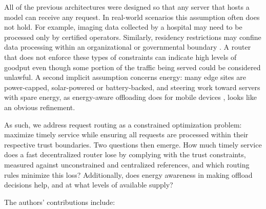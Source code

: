 \documentclass[journal]{IEEEtran}
\begin{document}
All of the previous architectures \cite{interedge,galaxy,servp,alpaserve,usher} were designed so that any server that hosts a model can receive any request. In real-world scenarios this assumption often does not hold. For example, imaging data collected by a hospital may need to be processed only by certified operators. Similarly, residency restrictions may confine data processing within an organizational or governmental boundary \cite{gdpr,hummel2021}. A router that does not enforce these types of constraints can indicate high levels of goodput even though some portion of the traffic being served could be considered unlawful. A second implicit assumption concerns energy: many edge sites are power-capped, solar-powered or battery-backed, and steering work toward servers with spare energy, as energy-aware offloading does for mobile devices \cite{mao2016harvest}, looks like an obvious refinement.

As such, we address request routing as a constrained optimization problem: maximize timely service while ensuring all requests are processed within their respective trust boundaries. Two questions then emerge. How much timely service does a fast decentralized router lose by complying with the trust constraints, measured against unconstrained and centralized references, and which routing rules minimize this loss? Additionally, does energy awareness in making offload decisions help, and at what levels of available supply?

The authors' contributions include:
\end{document}
